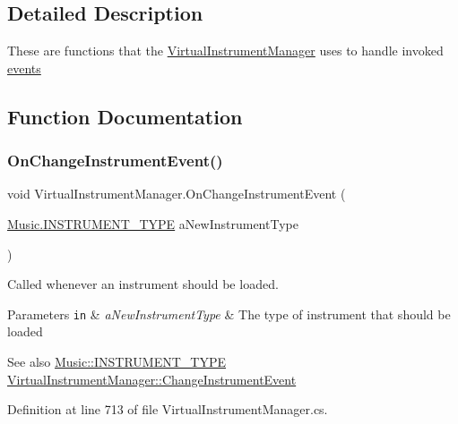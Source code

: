 \subsection{Detailed Description}
These are functions that the \hyperlink{class_virtual_instrument_manager}{Virtual\+Instrument\+Manager} uses to handle invoked \hyperlink{group___v_i_m_events}{events } 

\subsection{Function Documentation}
\mbox{\label{group___v_i_m_handlers_ga8e79286073756c31e08fecd59ce04fa7}} 
\subsubsection{\texorpdfstring{On\+Change\+Instrument\+Event()}{OnChangeInstrumentEvent()}}
{\footnotesize\ttfamily void Virtual\+Instrument\+Manager.\+On\+Change\+Instrument\+Event (\begin{DoxyParamCaption}\item[{\hyperlink{group___music_enums_gabfce60192305965558a36e368ebd67c3}{Music.\+I\+N\+S\+T\+R\+U\+M\+E\+N\+T\+\_\+\+T\+Y\+PE}}]{a\+New\+Instrument\+Type }\end{DoxyParamCaption})}



Called whenever an instrument should be loaded. 


\begin{DoxyParams}[1]{Parameters}
\mbox{\tt in}  & {\em a\+New\+Instrument\+Type} & The type of instrument that should be loaded\\
\hline
\end{DoxyParams}
\begin{DoxySeeAlso}{See also}
\hyperlink{group___music_enums_gabfce60192305965558a36e368ebd67c3}{Music\+::\+I\+N\+S\+T\+R\+U\+M\+E\+N\+T\+\_\+\+T\+Y\+PE} \hyperlink{group___v_i_m_event_types_class_virtual_instrument_manager_1_1_change_instrument_event}{Virtual\+Instrument\+Manager\+::\+Change\+Instrument\+Event} 
\end{DoxySeeAlso}


Definition at line 713 of file Virtual\+Instrument\+Manager.\+cs.



